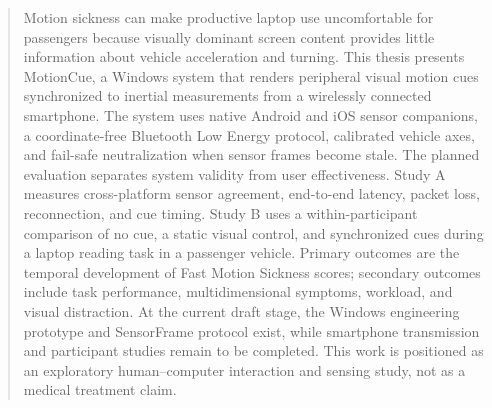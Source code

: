 \begin{abstract}
Motion sickness can make productive laptop use uncomfortable for passengers because visually dominant screen content provides little information about vehicle acceleration and turning. This thesis presents MotionCue, a Windows system that renders peripheral visual motion cues synchronized to inertial measurements from a wirelessly connected smartphone. The system uses native Android and iOS sensor companions, a coordinate-free Bluetooth Low Energy protocol, calibrated vehicle axes, and fail-safe neutralization when sensor frames become stale. The planned evaluation separates system validity from user effectiveness. Study A measures cross-platform sensor agreement, end-to-end latency, packet loss, reconnection, and cue timing. Study B uses a within-participant comparison of no cue, a static visual control, and synchronized cues during a laptop reading task in a passenger vehicle. Primary outcomes are the temporal development of Fast Motion Sickness scores; secondary outcomes include task performance, multidimensional symptoms, workload, and visual distraction. At the current draft stage, the Windows engineering prototype and SensorFrame protocol exist, while smartphone transmission and participant studies remain to be completed. This work is positioned as an exploratory human--computer interaction and sensing study, not as a medical treatment claim.
\end{abstract}
